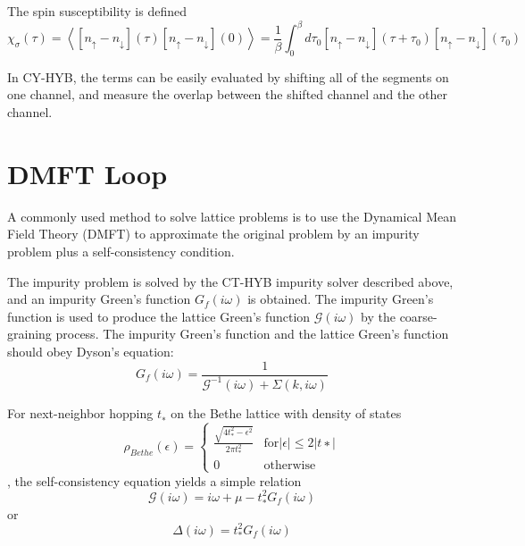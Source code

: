 The spin susceptibility is defined 
\begin{equation}
  \label{eq:chi-spin}
  \chi_\sigma(\tau)=\left\langle[n_\uparrow-n_\downarrow](\tau)  [n_\uparrow-n_\downarrow](0)\right\rangle=\frac{1}{\beta}\int_0^\beta d\tau_0[n_\uparrow-n_\downarrow](\tau+\tau_0)  [n_\uparrow-n_\downarrow](\tau_0)
\end{equation}

In CY-HYB, the terms can be easily evaluated by shifting all of the segments on one
channel, and measure the overlap between the shifted channel and the other channel.



\section{DMFT Loop}

A commonly used method to solve lattice problems is to use the Dynamical Mean
Field Theory (DMFT) to approximate the original problem by an impurity problem
plus a self-consistency condition.

The impurity problem is solved by the 
CT-HYB impurity solver described above, and an impurity Green's function 
$G_f(i\omega)$
is obtained. The impurity Green's function is used to produce the lattice
Green's function $\mathcal{G}(i\omega)$ by the coarse-graining process.
The impurity Green's function and the lattice Green's function should obey 
Dyson's equation:
\begin{equation}
  \label{eq:3}
  G_f(i\omega)=\frac{1}{\mathcal{G}^{-1}(i\omega)+\Sigma(k,i\omega)}
\end{equation}

For next-neighbor hopping $t_∗$ on the Bethe lattice with density of states 
\begin{equation}
  \label{eq:bethe_dos}
  \rho_{Bethe}(\epsilon)=\left\{
    \begin{array}{ll}
      \frac{\sqrt{4t_*^2-\epsilon^2}}{2\pi t_*^2}&\mathrm{for} |\epsilon|\leq 2|t∗|  \\
      0&\mathrm{otherwise}
    \end{array}
  \right.
\end{equation}
,
the self-consistency equation yields a simple relation
\begin{equation}
  \label{eq:5}
  \mathcal{G}(i\omega)=i\omega+\mu-t_*^2G_f(i\omega)
\end{equation}
or 
\begin{equation}
  \label{eq:6}
  \Delta(i\omega)=t_*^2G_f(i\omega)
\end{equation}

